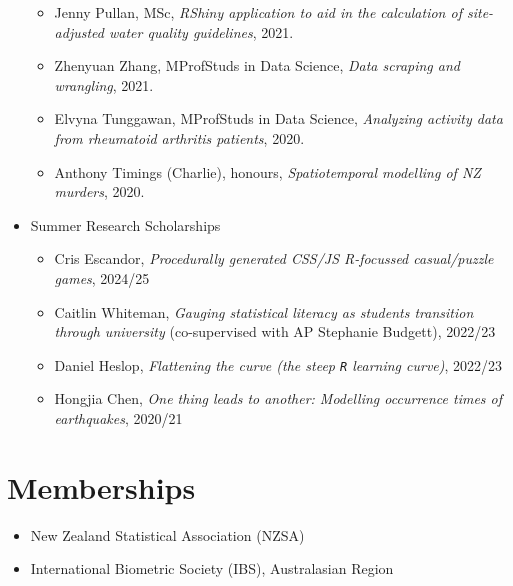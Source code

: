 \documentclass[10pt,a4paper]{moderncv}
\begin{document}
\begin{itemize}
\begin{itemize}
  \item Jenny Pullan, MSc, \textit{RShiny application to aid in the calculation of site-adjusted water quality guidelines}, 2021.
  \item Zhenyuan Zhang, MProfStuds in Data Science, \textit{Data scraping and wrangling}, 2021.
  \item Elvyna Tunggawan, MProfStuds in Data Science, \textit{Analyzing activity data from rheumatoid arthritis patients}, 2020.
  \item Anthony Timings (Charlie), honours, \textit{Spatiotemporal modelling of NZ murders}, 2020.
  \end{itemize}
\item Summer Research Scholarships
  \begin{itemize}
  \item Cris Escandor, \textit{Procedurally generated CSS/JS R-focussed casual/puzzle games}, 2024/25
  \item Caitlin Whiteman, \textit{Gauging statistical literacy as students transition through university} (co-supervised with AP Stephanie Budgett), 2022/23
  \item Daniel Heslop, \textit{Flattening the curve (the steep \texttt{R} learning curve)}, 2022/23
  \item Hongjia Chen, \textit{One thing leads to another: Modelling occurrence times of earthquakes}, 2020/21
  \end{itemize}
\end{itemize}




\section{Memberships}

\vspace{6pt}
\begin{itemize}
\item New Zealand Statistical Association (NZSA)
\item International Biometric Society (IBS), Australasian Region
\end{itemize}
\end{document}
